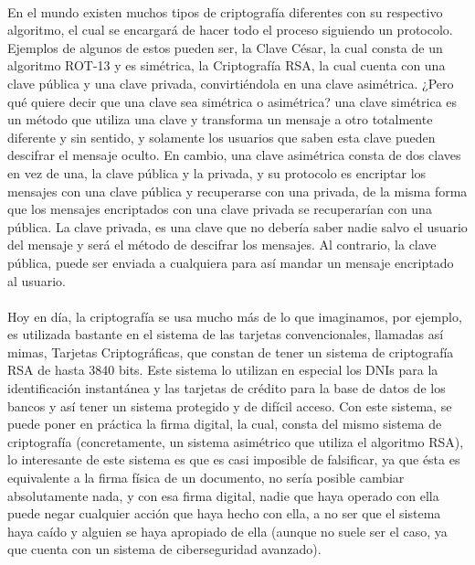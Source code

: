 \documentclass[12pt,a4paper]{book}
\theoremstyle{change}
\begin{document}
	\vspace{5mm}\\
	En el mundo existen muchos tipos de criptografía diferentes con su respectivo algoritmo, el cual se encargará de hacer todo el proceso siguiendo un protocolo. Ejemplos de algunos de estos pueden ser, la Clave César, la cual consta de un algoritmo ROT-13 y es simétrica, la Criptografía RSA, la cual cuenta con una clave pública y una clave privada, convirtiéndola en una clave asimétrica. ¿Pero qué quiere decir que una clave sea simétrica o asimétrica? una clave simétrica es un método que utiliza una clave y transforma un mensaje a otro totalmente diferente y sin sentido, y solamente los usuarios que saben esta clave pueden descifrar el mensaje oculto. En cambio, una clave asimétrica consta de dos claves en vez de una, la clave pública y la privada, y su protocolo es encriptar los mensajes con una clave pública y recuperarse con una privada, de la misma forma que los mensajes encriptados con una clave privada se recuperarían con una pública. La clave privada, es una clave que no debería saber nadie salvo el usuario del mensaje y será el método de descifrar los mensajes. Al contrario, la clave pública, puede ser enviada a cualquiera para así mandar un mensaje encriptado al usuario.\\
	\vspace{5mm}\\%
	Hoy en día, la criptografía se usa mucho más de lo que imaginamos, por ejemplo, es utilizada bastante en el sistema de las tarjetas convencionales, llamadas así mimas, Tarjetas Criptográficas, que constan de tener un sistema de criptografía RSA de hasta 3840 bits. Este sistema lo utilizan en especial los DNIs para la identificación instantánea y las tarjetas de crédito para la base de datos de los bancos y así tener un sistema protegido y de difícil acceso. Con este sistema, se puede poner en práctica la firma digital, la cual, consta del mismo sistema de criptografía (concretamente, un sistema asimétrico que utiliza el algoritmo RSA), lo interesante de este sistema es que es casi imposible de falsificar, ya que ésta es equivalente a la firma física de un documento, no sería posible cambiar absolutamente nada, y con esa firma digital, nadie que haya operado con ella puede negar cualquier acción que haya hecho con ella, a no ser que el sistema haya caído y alguien se haya apropiado de ella (aunque no suele ser el caso, ya que cuenta con un sistema de ciberseguridad avanzado).\\ 
	\vspace{5mm}\\ %
\end{document}
